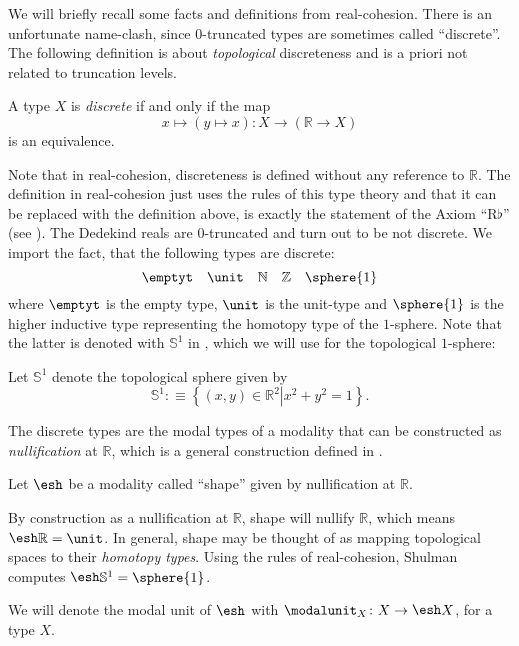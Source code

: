 \documentclass{msc}
\newcommand{\shape}{\ensuremath{\mathord{\raisebox{0.5pt}{\text{\rm\esh}}}}}
\newcommand{\bN}{\mathbb N}
\newcommand{\bZ}{\mathbb Z}
\newcommand{\bR}{\mathbb R}
\newcommand{\bS}{\mathbb S}
\begin{document}
We will briefly recall some facts and definitions from real-cohesion.
There is an unfortunate name-clash, since 0-truncated types are sometimes called ``discrete''.
The following definition is about \emph{topological} discreteness and is a priori not related to truncation levels.
\begin{defn}
  A type $X$ is \emph{discrete} if and only if the map
  \[ x\mapsto (y\mapsto x) : X \to (\bR \to X) \]
  is an equivalence.
\end{defn}
Note that in real-cohesion, discreteness is defined without any reference to $\bR$.
The definition in real-cohesion just uses the rules of this type theory and that it can be replaced with the definition above,
is exactly the statement of the Axiom ``$\mathrm{R}\flat$'' (see \cite[Section 8]{ShulmanRealCohesion}).
The Dedekind reals are 0-truncated and turn out to be not discrete.
We import the fact, that the following types are discrete:
\[ \emptyt \quad \unit \quad \bN \quad \bZ \quad \sphere{1} \]
where $\emptyt$ is the empty type,
$\unit$ is the unit-type and $\sphere{1}$ is the higher inductive type representing the homotopy type of the $1$-sphere.
Note that the latter is denoted with $\bS^1$ in \cite{UFP}, which we will use for the topological $1$-sphere:
\begin{defn}
  Let $\bS^{1}$ denote the topological sphere given by
  \[ \bS^{1}:\equiv\left\{ (x,y)\in\bR^{2}\left\vert x^2+y^2=1\right.\right\}.\]
\end{defn}

The discrete types are the modal types of a modality that can be constructed as \emph{nullification} at $\bR$,
which is a general construction defined in \cite[Section 2.3]{RijkeSpittersShulman}.
\begin{defn}
  Let $\shape$ be a modality called ``shape'' given by nullification at $\bR$.
\end{defn}
By construction as a nullification at $\bR$, shape will nullify $\bR$, which means $\shape \bR=\unit$. 
In general, shape may be thought of as mapping topological spaces to their \emph{homotopy types}.
Using the rules of real-cohesion, Shulman computes $\shape \bS^1 =\sphere{1}$.

We will denote the modal unit of $\shape$ with $\modalunit_X\colon X \to \shape X$, for a type $X$.
\end{document}

